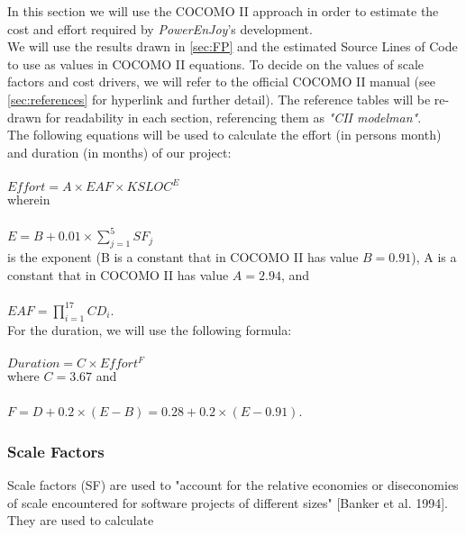 In this section we will use the COCOMO II approach in order to estimate the cost and effort required by \textit{PowerEnJoy}'s development. \\

We will use the results drawn in \autoref{sec:FP} and the estimated Source Lines of Code to use as values in COCOMO II equations. To decide on the values of scale factors and cost drivers, we will refer to the official COCOMO II manual (see \autoref{sec:references} for hyperlink and further detail). The reference tables will be re-drawn for readability in each section, referencing them as \textit{"CII modelman"}.\\

The following equations will be used to calculate the effort (in persons month) and duration (in months) of our project:

		\paragraph{}\(Effort = A \times EAF \times KSLOC^E\)\\
wherein
		\paragraph{}\(E = B + 0.01 \times \sum_{j=1}^{5}SF_j\)\\
is the exponent (B is a constant that in COCOMO II has value $B=0.91$), A is a constant that in COCOMO II has value $A=2.94$, and
		\paragraph{}\(EAF = \prod_{i=1}^{17}CD_i \).\\

For the duration, we will use the following formula:
		\paragraph{}\(Duration = C \times Effort^F\)\\
where $C=3.67$ and
		\paragraph{}\(F = D + 0.2 \times (E - B) = 0.28 + 0.2 \times ( E - 0.91 )\).


\subsubsection{Scale Factors}

Scale factors (SF) are used to "account for the relative economies or diseconomies of scale encountered for software projects of different sizes" [Banker et al. 1994]. They are used to calculate 